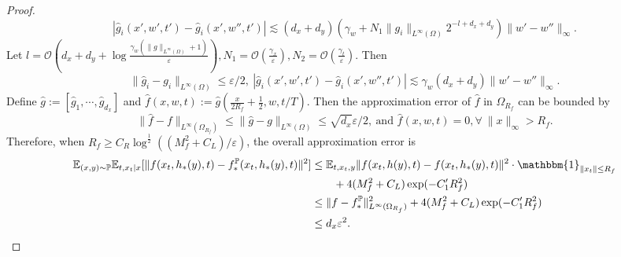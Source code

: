 \documentclass{article}
\numberwithin{equation}{section}
\newcommand{\E}{\mathbb{E}}
\theoremstyle{definition}
\renewcommand{\P}{\mathbb{P}}
\begin{document}
\begin{proof}
    \begin{equation}
        |\widehat{g}_i(x',w',t')-\widehat{g}_i(x',w'',t')|\lesssim (d_x+d_y)\left(\gamma_w+N_1\|g_i\|_{L^\infty(\Omega)}2^{-l+d_x+d_y}\right)\|w'-w''\|_{\infty}.
    \end{equation}
    Let $l=\mathcal{O}\left(d_x+d_y+\log\frac{\gamma_w(\|g\|_{L^\infty(\Omega)}+1)}{\varepsilon}\right), N_1=\mathcal{O}\left(\frac{\gamma_x}{\varepsilon}\right),N_2=\mathcal{O}\left(\frac{\gamma_t}{\varepsilon}\right)$.
    Then
    \begin{equation}\label{eq:err_nn_g}
        \|\widehat{g}_i-g_i\|_{L^\infty(\Omega)}\leq \varepsilon/2,\ |\widehat{g}_i(x',w',t')-\widehat{g}_i(x',w'',t')|\lesssim \gamma_w(d_x+d_y)\|w'-w''\|_\infty.
    \end{equation}
    Define $\widehat{g}:=[\widehat{g}_1,\cdots,\widehat{g}_{d_x}]$ and $\widehat{f}(x,w,t):=\widehat{g}\left(\frac{x}{2R_f}+\frac{1}{2},w,t/T\right)$.
    Then the approximation error of $\widehat{f}$ in $\Omega_{R_f}$ can be bounded by
    \begin{equation}
        \|\widehat{f}-f\|_{L^\infty(\Omega_{R_f})}\leq\|\widehat{g}-g\|_{L^\infty(\Omega)}\leq \sqrt{d_x}\varepsilon/2,\ \text{and }\widehat{f}(x,w,t)=0, \forall\ \|x\|_{\infty}>R_f.
    \end{equation}
    Therefore, when $R_f\geq C_R\log^{\frac{1}{2}}\left((M_f^2+C_L)/\varepsilon\right)$, the overall approximation error is
    \begin{equation}
        \begin{aligned}
            \E_{(x,y)\sim\P}\E_{t,x_t|x} [\|f(x_t,h_*(y),t)-f_*^\P(x_t,h_*(y),t)\|^2]
            &\leq \E_{t,x_t,y} \|f(x_t,h(y),t)-f(x_t,h_*(y),t)\|^2\cdot \mathbbm{1}_{\|x_t\|\leq R_f} \\
            &\qquad + 4(M_f^2+C_L)\exp(-C_1'R_f^2) \\
            &\leq \|f-f_*^\P\|_{L^\infty(\Omega_{R_f})}^2 + 4(M_f^2+C_L)\exp(-C_1'R_f^2) \\
            &\leq d_x\varepsilon^2.
        \end{aligned}
    \end{equation}
    

\end{proof}
\end{document}
